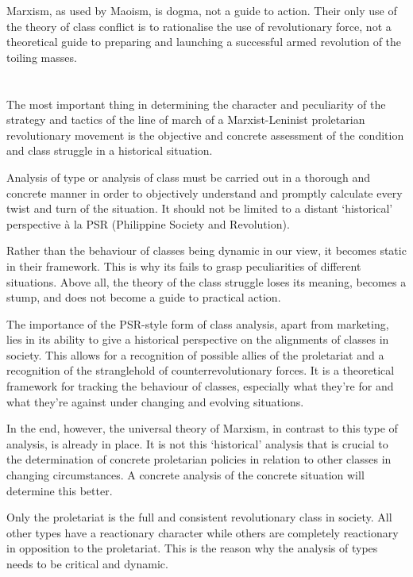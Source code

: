 \documentclass[a4paper,11pt,onesided]{report}
\begin{document}
Marxism, as used by Maoism, is dogma, not a guide to action. 
Their only use of the theory of class conflict is to rationalise 
the use of revolutionary force, 
not a theoretical guide to preparing 
and launching a successful armed revolution of the toiling masses.

\section{}
The most important thing in determining the character and peculiarity 
of the strategy and tactics of the line of march of 
a Marxist-Leninist proletarian revolutionary movement 
is the objective and concrete assessment 
of the condition and class struggle in a historical situation.

Analysis of type or analysis of class must be carried out in 
a thorough and concrete manner in order to 
objectively understand and promptly calculate 
every twist and turn of the situation. 
It should not be limited to a distant `historical' perspective 
à la PSR (Philippine Society and Revolution).

Rather than the behaviour of classes being dynamic in our view, 
it becomes static in their framework. 
This is why its fails to grasp 
peculiarities of different situations.
Above all, the theory of the class struggle loses its meaning,
becomes a stump, and does not become a guide to practical action.

The importance of the PSR-style form of class analysis, 
apart from marketing, 
lies in its ability to give a 
historical perspective on the alignments of classes in society. 
This allows for a recognition of possible allies of the proletariat 
and a recognition of the stranglehold of counterrevolutionary forces. 
It is a theoretical framework for tracking the behaviour of classes, 
especially what they're for and what they're against under 
changing and evolving situations.

In the end, however, the universal theory of Marxism,
in contrast to this type of analysis, 
is already in place. 
It is not this `historical' analysis that is crucial 
to the determination of concrete proletarian policies 
in relation to other classes in changing circumstances. 
A concrete analysis of the concrete situation will determine this better.

Only the proletariat is the full and consistent revolutionary class in society. 
All other types have a reactionary character 
while others are completely reactionary in opposition to the proletariat. 
This is the reason why the analysis of types needs to be critical and dynamic.
\end{document}
